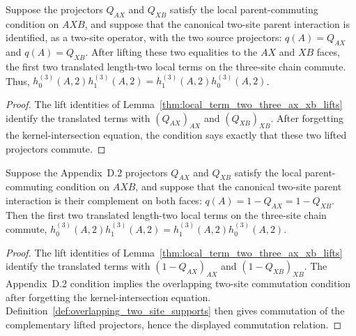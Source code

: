 \begin{lemma}
    \label{thm:local_term_two_three_commute_from_source_q}
    \leanok
    Suppose the projectors $Q_{AX}$ and $Q_{XB}$ satisfy the
    \cite[Definition~D.2]{Cirac2016MPDO_arXiv} local parent-commuting
    condition on $A X B$, and suppose that the canonical two-site parent
    interaction is identified, as a two-site operator, with the two source
    projectors: $q(A)=Q_{AX}$ and $q(A)=Q_{XB}$. After lifting these two
    equalities to the $AX$ and $XB$ faces, the first two translated length-two
    local terms on the three-site chain commute. Thus,
    $h^{(3)}_0(A,2)h^{(3)}_1(A,2) = h^{(3)}_1(A,2)h^{(3)}_0(A,2)$.
\end{lemma}

\begin{proof}\leanok
    The lift identities of Lemma~\ref{thm:local_term_two_three_ax_xb_lifts}
    identify the translated terms with $(Q_{AX})_{AX}$ and $(Q_{XB})_{XB}$.
    After forgetting the kernel-intersection equation, the
    \cite[Definition~D.2]{Cirac2016MPDO_arXiv} condition says exactly that
    these two lifted projectors commute.
\end{proof}

\begin{lemma}
    \label{thm:local_term_two_three_commute_from_complement_ax_xb}
    \leanok
    Suppose the Appendix~D.2 projectors $Q_{AX}$ and $Q_{XB}$ satisfy the
    local parent-commuting condition on $A X B$, and suppose that the canonical
    two-site parent interaction is their complement on both faces:
    $q(A)=1-Q_{AX}=1-Q_{XB}$. Then the first two translated length-two local
    terms on the three-site chain commute,
    $h^{(3)}_0(A,2)h^{(3)}_1(A,2) = h^{(3)}_1(A,2)h^{(3)}_0(A,2)$.
\end{lemma}

\begin{proof}\leanok
    The lift identities of Lemma~\ref{thm:local_term_two_three_ax_xb_lifts}
    identify the translated terms with $(1-Q_{AX})_{AX}$ and
    $(1-Q_{XB})_{XB}$. The Appendix~D.2 condition implies the overlapping
    two-site commutation condition after forgetting the kernel-intersection
    equation. Definition~\ref{def:overlapping_two_site_supports} then gives
    commutation of the complementary lifted projectors, hence the displayed
    commutation relation.
\end{proof}

